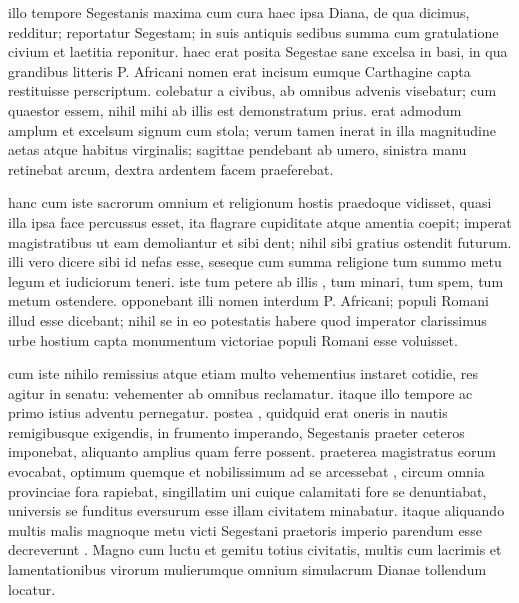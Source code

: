  illo tempore Segestanis maxima cum cura haec ipsa Diana, de qua dicimus, redditur; reportatur Segestam; in suis antiquis sedibus summa cum gratulatione civium et laetitia reponitur. haec erat posita Segestae sane excelsa in basi, in qua grandibus litteris P. Africani nomen erat incisum eumque Carthagine capta restituisse perscriptum. colebatur a civibus, ab omnibus advenis visebatur; cum quaestor essem, nihil mihi ab illis est demonstratum prius. erat admodum amplum et excelsum signum cum stola; verum tamen inerat in illa magnitudine aetas atque habitus virginalis; sagittae pendebant ab umero, sinistra manu retinebat arcum, dextra ardentem facem praeferebat.

 hanc cum iste sacrorum omnium et religionum hostis praedoque vidisset, quasi illa ipsa face percussus esset, ita flagrare cupiditate atque amentia coepit; imperat magistratibus ut eam demoliantur et sibi dent; nihil sibi gratius ostendit futurum. illi vero dicere sibi id nefas esse, seseque cum summa religione tum summo metu legum et iudiciorum teneri. iste tum petere ab illis , tum minari, tum spem, tum metum ostendere. opponebant illi nomen interdum P. Africani; populi Romani illud esse dicebant; nihil se in eo potestatis habere quod imperator clarissimus urbe hostium capta monumentum victoriae populi Romani esse voluisset.

 cum iste nihilo remissius atque etiam multo vehementius instaret cotidie, res agitur in senatu: vehementer ab omnibus reclamatur. itaque illo tempore ac primo istius adventu pernegatur. postea , quidquid erat oneris in nautis remigibusque exigendis, in frumento imperando, Segestanis praeter ceteros imponebat, aliquanto amplius quam ferre possent. praeterea magistratus eorum evocabat, optimum quemque et nobilissimum ad se arcessebat , circum omnia provinciae fora rapiebat, singillatim uni cuique calamitati fore se denuntiabat, universis se funditus eversurum esse illam civitatem minabatur. itaque aliquando multis malis magnoque metu victi Segestani praetoris imperio parendum esse decreverunt . Magno cum luctu et gemitu totius civitatis, multis cum lacrimis et lamentationibus virorum mulierumque omnium simulacrum Dianae tollendum locatur.

